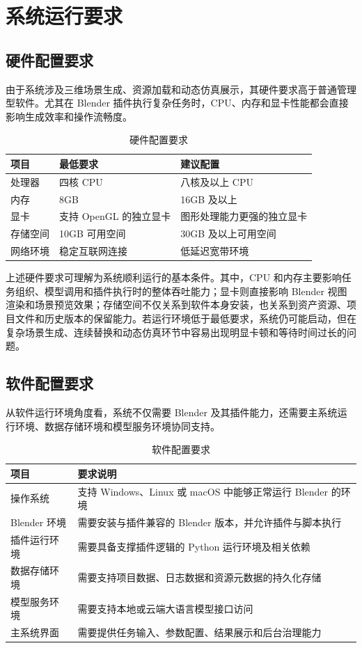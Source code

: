 \documentclass[UTF8,a4paper,10pt]{ctexart}
\begin{document}
\section{系统运行要求}

\subsection{硬件配置要求}
由于系统涉及三维场景生成、资源加载和动态仿真展示，其硬件要求高于普通管理型软件。尤其在 Blender 插件执行复杂任务时，CPU、内存和显卡性能都会直接影响生成效率和操作流畅度。

\begin{table}[H]
\centering
\caption{硬件配置要求}
\begin{tabularx}{\textwidth}{p{3.0cm} Y Y}
\toprule
项目 & 最低要求 & 建议配置 \\
\midrule
处理器 & 四核 CPU & 八核及以上 CPU \\
内存 & 8GB & 16GB 及以上 \\
显卡 & 支持 OpenGL 的独立显卡 & 图形处理能力更强的独立显卡 \\
存储空间 & 10GB 可用空间 & 30GB 及以上可用空间 \\
网络环境 & 稳定互联网连接 & 低延迟宽带环境 \\
\bottomrule
\end{tabularx}
\end{table}

上述硬件要求可理解为系统顺利运行的基本条件。其中，CPU 和内存主要影响任务组织、模型调用和插件执行时的整体吞吐能力；显卡则直接影响 Blender 视图渲染和场景预览效果；存储空间不仅关系到软件本身安装，也关系到资产资源、项目文件和历史版本的保留能力。若运行环境低于最低要求，系统仍可能启动，但在复杂场景生成、连续替换和动态仿真环节中容易出现明显卡顿和等待时间过长的问题。

\subsection{软件配置要求}
从软件运行环境角度看，系统不仅需要 Blender 及其插件能力，还需要主系统运行环境、数据存储环境和模型服务环境协同支持。

\begin{table}[H]
\centering
\caption{软件配置要求}
\begin{tabularx}{\textwidth}{p{3.0cm} Y}
\toprule
项目 & 要求说明 \\
\midrule
操作系统 & 支持 Windows、Linux 或 macOS 中能够正常运行 Blender 的环境 \\
Blender 环境 & 需要安装与插件兼容的 Blender 版本，并允许插件与脚本执行 \\
插件运行环境 & 需要具备支撑插件逻辑的 Python 运行环境及相关依赖 \\
数据存储环境 & 需要支持项目数据、日志数据和资源元数据的持久化存储 \\
模型服务环境 & 需要支持本地或云端大语言模型接口访问 \\
主系统界面 & 需要提供任务输入、参数配置、结果展示和后台治理能力 \\
\bottomrule
\end{tabularx}
\end{table}
\end{document}
